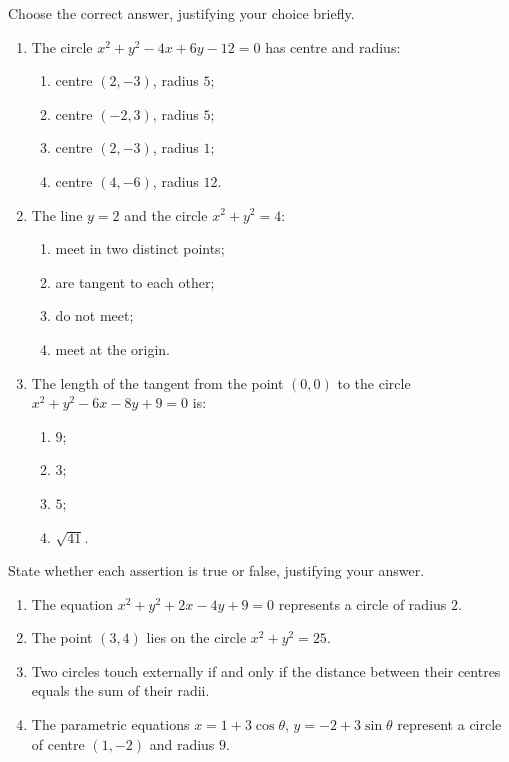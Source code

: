 \documentclass[11pt]{article}
\begin{document}
\begin{exercice}
Choose the correct answer, justifying your choice briefly.
\begin{enumerate}
\item The circle $x^2 + y^2 - 4x + 6y - 12 = 0$ has centre and radius:
\begin{enumerate}
\item centre $(2, -3)$, radius $5$;
\item centre $(-2, 3)$, radius $5$;
\item centre $(2, -3)$, radius $1$;
\item centre $(4, -6)$, radius $12$.
\end{enumerate}
\item The line $y = 2$ and the circle $x^2 + y^2 = 4$:
\begin{enumerate}
\item meet in two distinct points;
\item are tangent to each other;
\item do not meet;
\item meet at the origin.
\end{enumerate}
\item The length of the tangent from the point $(0, 0)$ to the circle $x^2 + y^2 - 6x - 8y + 9 = 0$ is:
\begin{enumerate}
\item $9$; \item $3$; \item $5$; \item $\sqrt{41}$.
\end{enumerate}
\end{enumerate}
\end{exercice}

\begin{exercice}
State whether each assertion is true or false, justifying your answer.
\begin{enumerate}
\item The equation $x^2 + y^2 + 2x - 4y + 9 = 0$ represents a circle of radius $2$.
\item The point $(3, 4)$ lies on the circle $x^2 + y^2 = 25$.
\item Two circles touch externally if and only if the distance between their centres equals the sum of their radii.
\item The parametric equations $x = 1 + 3\cos\theta$, $y = -2 + 3\sin\theta$ represent a circle of centre $(1, -2)$ and radius $9$.
\end{enumerate}
\end{exercice}
\end{document}
